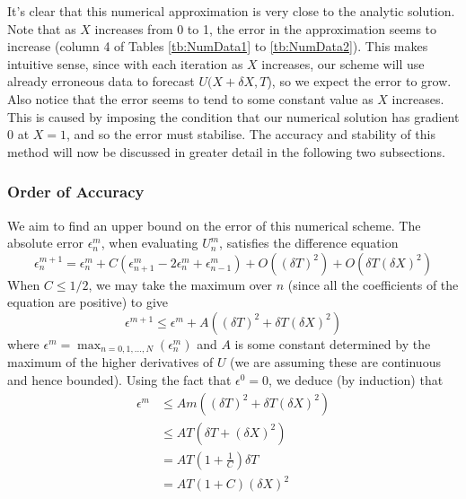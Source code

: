 \documentclass[10pt,a4paper,notitlepage]{article}
\begin{document}
It's clear that this numerical approximation is very close to the analytic solution. Note that as $X$ increases from 0 to 1, the error in the approximation seems to increase (column 4 of Tables \ref{tb:NumData1} to \ref{tb:NumData2}). This makes intuitive sense, since with each iteration as $X$ increases, our scheme will use already erroneous data to forecast $U(X+\delta X,T$), so we expect the error to grow. Also notice that the error seems to tend to some constant value as $X$ increases. This is caused by  imposing the condition that our numerical solution has gradient 0 at $X=1$, and so the error must stabilise. The accuracy and stability of this method will now be discussed in greater detail in the following two subsections.
\subsubsection*{\centering Order of Accuracy}
We aim to find an upper bound on the error of this numerical scheme. The absolute error $\epsilon_{n}^{m}$, when evaluating $U_{n}^{m}$, satisfies the difference equation
\begin{equation}\label{eq:SpecialC}
\epsilon_{n}^{m+1}=\epsilon_{n}^{m}+C\left(\epsilon_{n+1}^{m}-2\epsilon_{n}^{m}+\epsilon_{n-1}^{m}\right)+O\left(\left(\delta T\right)^{2}\right)+O\left(\delta T \left(\delta X\right)^{2}\right)
\end{equation} 
When $C\leq 1/2$, we may take the maximum over $n$ (since all the coefficients of the equation are positive) to give
\begin{equation}
\epsilon^{m+1} \leq \epsilon^{m} +A\left(\left(\delta T\right)^{2}+\delta T \left(\delta X\right)^{2}\right)
\end{equation}
where $\epsilon^{m}=\max_{n=0,1,...,N}\left(\epsilon_{n}^{m}\right)$ and $A$ is some constant determined by the maximum of the higher derivatives of $U$ (we are assuming these are continuous and hence bounded). Using the fact that $\epsilon^{0}=0$, we deduce (by induction) that
\begin{equation}
\begin{aligned}
\epsilon^{m} &\leq Am\left(\left(\delta T\right)^{2}+\delta T \left(\delta X\right)^{2}\right)\\
&\leq AT\left(\delta T+\left(\delta X\right)^{2}\right)\\
&= AT\left(1+\frac{1}{C}\right)\delta T\\
&= AT\left( 1+C\right)\left(\delta X\right)^{2}
\end{aligned}
\end{equation}
\end{document}
